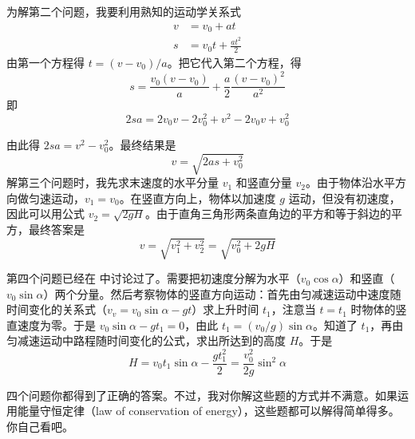 \begin{dialogue}
为解第二个问题，我要利用熟知的运动学关系式
\begin{equation*}%
\begin{split}
v & = v_{0} + at\\
s & = v_{0}t+ \frac{at^{2}}{2}
\end{split}
\end{equation*}
由第一个方程得 $t= (v - v_{0})/a$。把它代入第二个方程，得
\begin{equation*}%
s = \frac{ v_{0}(v - v_{0})}{a} + \frac{a}{2} \frac{(v - v_{0})^{2}}{a^{2}}
\end{equation*}
即
\begin{equation*}%
2sa = 2 v_{0}v - 2v_{0}^{2}+ v^{2} - 2 v_{0}v + v_{0}^{2}
\end{equation*}

由此得 $2sa=v^{2}-v_{0}^{2}$。最终结果是
\begin{equation}%
v= \sqrt{2as+v_{0}^{2}}
\label{eq-48}
\end{equation}
解第三个问题时，我先求末速度的水平分量 $v_{1}$ 和竖直分量 $v_{2}$。由于物体沿水平方向做匀速运动，$v_{1} = v_{0}$。在竖直方向上，物体以加速度 $g$ 运动，但没有初速度，因此可以用公式 $v_{2}=\sqrt{2gH}$。由于直角三角形两条直角边的平方和等于斜边的平方，最终答案是
\begin{equation}
v=\sqrt{v_{1}^{2}+v_{2}^{2}} =\sqrt{v_{0}^{2}+2gH}
\label{eq-49}
\end{equation}


第四个问题已经在 中讨论过了。需要把初速度分解为水平（$v_{0} \cos \alpha$）和竖直（$v_{0} \sin \alpha$）两个分量。然后考察物体的竖直方向运动：首先由匀减速运动中速度随时间变化的关系式（$v_{v}=v_{0} \sin \alpha -gt$）求上升时间 $t_{1}$，注意当 $t=t_{1}$ 时物体的竖直速度为零。于是 $v_{0} \sin \alpha -gt_{1} =0$，由此 $t_{1} = (v_{0}/g) \sin \alpha$。知道了 $t_{1}$，再由匀减速运动中路程随时间变化的公式，求出所达到的高度 $H$。于是
\begin{equation*}%
H = v_{0} t_{1} \sin \alpha - \frac{gt_{1}^{2}}{2} =  \frac{v_{0}^{2}}{2g}\sin^{2} \alpha
\end{equation*}

\tchr 四个问题你都得到了正确的答案。不过，我对你解这些题的方式并不满意。如果运用能量守恒定律（law of conservation of energy），这些题都可以解得简单得多。你自己看吧。
\begin{description}[leftmargin=1cm, style=nextline]


\end{description}
\end{dialogue}
